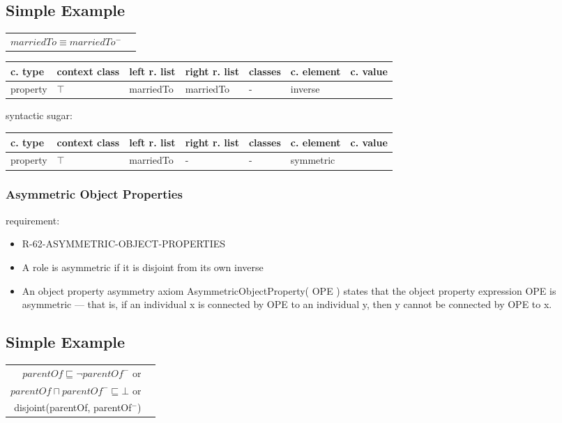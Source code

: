 \documentclass{llncs}
\newenvironment{gcotable}{
  \scriptsize
  \sffamily
  \vspace{0.3cm}
	\begin{center}
  \begin{tabular}{l|l|l|l|l|l|l}
  \hline
  \textbf{c. type} & \textbf{context class} & \textbf{left r. list} & \textbf{right r. list} & \textbf{classes} & \textbf{c. element} & \textbf{c. value} \\
  \hline

}{
  \hline
  \end{tabular}
	\end{center}
}
\newenvironment{DL}{
	\begin{center}
  \begin{tabular}{r l}

}{
  \end{tabular}
	\end{center}
}
\begin{document}
\subsection{Simple Example}

\begin{DL}
$marriedTo \equiv marriedTo^{-}$ \\
\end{DL}

\begin{gcotable}
property & $\top$ & marriedTo & marriedTo & - & inverse \\
\end{gcotable}

syntactic sugar:

\begin{gcotable}
property & $\top$ & marriedTo & - & - & symmetric \\
\end{gcotable}

\subsubsection{Asymmetric Object Properties}

requirement:

\begin{itemize}
	\item R-62-ASYMMETRIC-OBJECT-PROPERTIES
\end{itemize}

\begin{itemize}
	\item A role is asymmetric if it is disjoint from its own inverse \cite{Kroetzsch2012}
	\item An object property asymmetry axiom AsymmetricObjectProperty( OPE ) states that the object property expression OPE is asymmetric — that is, if an individual x is connected by OPE to an individual y, then y cannot be connected by OPE to x. 
\end{itemize}

\subsection{Simple Example}

\begin{DL}
$parentOf \sqsubseteq \neg parentOf^{-}$ or\\
$parentOf \sqcap parentOf^{-} \sqsubseteq \bot$ or \\
disjoint(parentOf, parentOf$^{-}$)
\end{DL}
\end{document}

